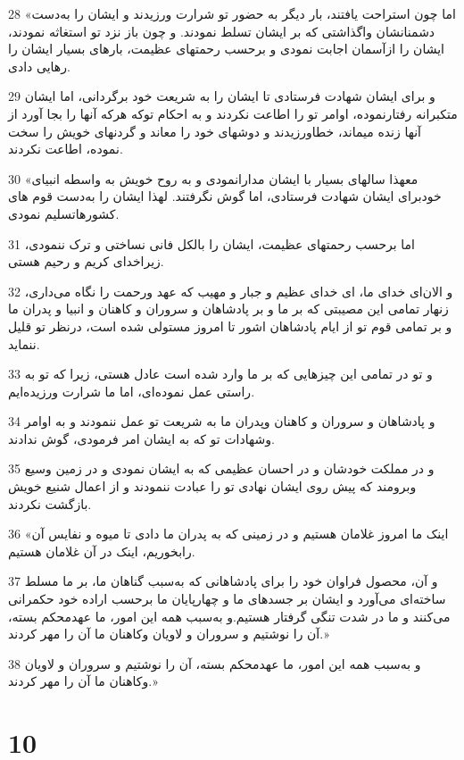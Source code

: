 \par 28 «اما چون استراحت یافتند، بار دیگر به حضور تو شرارت ورزیدند و ایشان را به‌دست دشمنانشان واگذاشتی که بر ایشان تسلط نمودند. و چون باز نزد تو استغاثه نمودند، ایشان را ازآسمان اجابت نمودی و برحسب رحمتهای عظیمت، بارهای بسیار ایشان را رهایی دادی.
\par 29 و برای ایشان شهادت فرستادی تا ایشان را به شریعت خود برگردانی، اما ایشان متکبرانه رفتارنموده، اوامر تو را اطاعت نکردند و به احکام توکه هر‌که آنها را بجا آورد از آنها زنده میماند، خطاورزیدند و دوشهای خود را معاند و گردنهای خویش را سخت نموده، اطاعت نکردند.
\par 30 «معهذا سالهای بسیار با ایشان مدارانمودی و به روح خویش به واسطه انبیای خودبرای ایشان شهادت فرستادی، اما گوش نگرفتند. لهذا ایشان را به‌دست قوم های کشورهاتسلیم نمودی.
\par 31 اما برحسب رحمتهای عظیمت، ایشان را بالکل فانی نساختی و ترک ننمودی، زیراخدای کریم و رحیم هستی.
\par 32 و الان‌ای خدای ما، ای خدای عظیم و جبار و مهیب که عهد ورحمت را نگاه می‌داری، زنهار تمامی این مصیبتی که بر ما و بر پادشاهان و سروران و کاهنان و انبیا و پدران ما و بر تمامی قوم تو از ایام پادشاهان اشور تا امروز مستولی شده است، درنظر تو قلیل ننماید.
\par 33 و تو در تمامی این چیزهایی که بر ما وارد شده است عادل هستی، زیرا که تو به راستی عمل نموده‌ای، اما ما شرارت ورزیده‌ایم.
\par 34 و پادشاهان و سروران و کاهنان وپدران ما به شریعت تو عمل ننمودند و به اوامر وشهادات تو که به ایشان امر فرمودی، گوش ندادند.
\par 35 و در مملکت خودشان و در احسان عظیمی که به ایشان نمودی و در زمین وسیع وبرومند که پیش روی ایشان نهادی تو را عبادت ننمودند و از اعمال شنیع خویش بازگشت نکردند.
\par 36 «اینک ما امروز غلامان هستیم و در زمینی که به پدران ما دادی تا میوه و نفایس آن رابخوریم، اینک در آن غلامان هستیم.
\par 37 و آن، محصول فراوان خود را برای پادشاهانی که به‌سبب گناهان ما، بر ما مسلط ساخته‌ای می‌آورد و ایشان بر جسدهای ما و چهارپایان ما برحسب اراده خود حکمرانی می‌کنند و ما در شدت تنگی گرفتار هستیم.و به‌سبب همه این امور، ما عهدمحکم بسته، آن را نوشتیم و سروران و لاویان وکاهنان ما آن را مهر کردند.»
\par 38 و به‌سبب همه این امور، ما عهدمحکم بسته، آن را نوشتیم و سروران و لاویان وکاهنان ما آن را مهر کردند.»
 
\chapter{10}

